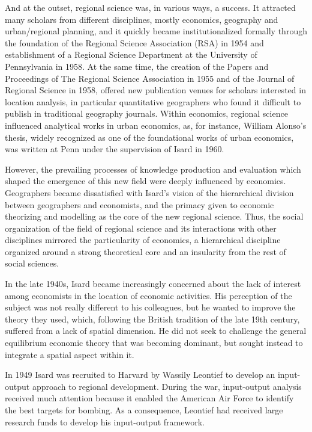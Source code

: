 \documentclass[
]{book}
\begin{document}
And at the outset, regional science was, in various ways, a success. It attracted many scholars from different disciplines, mostly economics, geography and urban/regional planning, and it quickly became institutionalized formally through the foundation of the Regional Science Association (RSA) in 1954 and establishment of a Regional Science Department at the University of Pennsylvania in 1958. At the same time, the creation of the Papers and Proceedings of The Regional Science Association in 1955 and of the Journal of Regional Science in 1958, offered new publication venues for scholars interested in location analysis, in particular quantitative geographers who found it difficult to publish in traditional geography journals. Within economics, regional science influenced analytical works in urban economics, as, for instance, William Alonso's thesis, widely recognized as one of the foundational works of urban economics, was written at Penn under the supervision of Isard in 1960.

However, the prevailing processes of knowledge production and evaluation which shaped the emergence of this new field were deeply influenced by economics. Geographers became dissatisfied with Isard's vision of the hierarchical division between geographers and economists, and the primacy given to economic theorizing and modelling as the core of the new regional science. Thus, the social organization of the field of regional science and its interactions with other disciplines mirrored the particularity of economics, a hierarchical discipline organized around a strong theoretical core and an insularity from the rest of social sciences.

In the late 1940s, Isard became increasingly concerned about the lack of interest among economists in the location of economic activities. His perception of the subject was not really different to his colleagues, but he wanted to improve the theory they used, which, following the British tradition of the late 19th century, suffered from a lack of spatial dimension. He did not seek to challenge the general equilibrium economic theory that was becoming dominant, but sought instead to integrate a spatial aspect within it.

In 1949 Isard was recruited to Harvard by Wassily Leontief to develop an input-output approach to regional development. During the war, input-output analysis received much attention because it enabled the American Air Force to identify the best targets for bombing. As a consequence, Leontief had received large research funds to develop his input-output framework.
\end{document}
